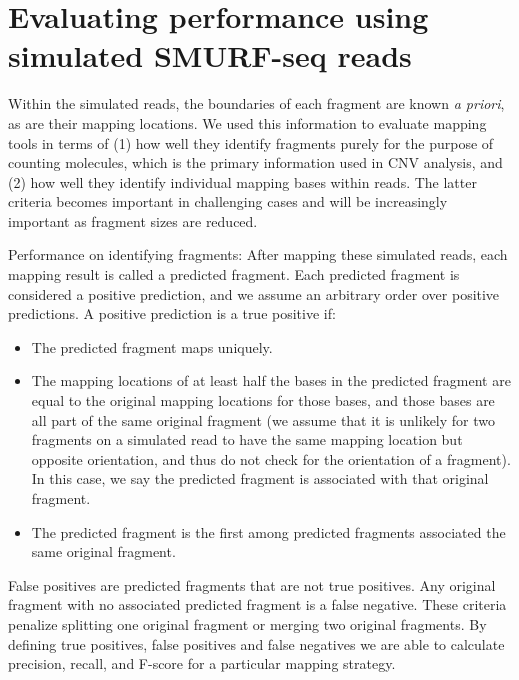\section*{Evaluating performance using simulated SMURF-seq reads}
Within the simulated reads, the boundaries of each fragment are known
\textit{a priori}, as are their mapping locations. We used this
information to evaluate mapping tools in terms of (1) how well they
identify fragments purely for the purpose of counting molecules, which
is the primary information used in CNV analysis, and (2) how well they
identify individual mapping bases within reads. The latter criteria
becomes important in challenging cases and will be increasingly
important as fragment sizes are reduced.

Performance on identifying fragments: After mapping these simulated
reads, each mapping result is called a predicted fragment. Each
predicted fragment is considered a positive prediction, and we assume
an arbitrary order over positive predictions. A positive prediction is
a true positive if:
\begin{itemize}
\item The predicted fragment maps uniquely.
\item The mapping locations of at least half the bases in the
  predicted fragment are equal to the original mapping locations for
  those bases, and those bases are all part of the same original
  fragment (we assume that it is unlikely for two fragments on a simulated
  read to have the same mapping location but opposite orientation, and thus
  do not check for the orientation of a fragment). In this case, we say the
  predicted fragment is associated with that original fragment.
\item The predicted fragment is the first among predicted fragments
  associated the same original fragment.
\end{itemize}
False positives are predicted fragments that are not true positives. Any
original fragment with no associated predicted fragment is a false
negative. These criteria penalize splitting one original fragment or
merging two original fragments. By defining true positives, false
positives and false negatives we are able to calculate precision,
recall, and F-score for a particular mapping strategy.

